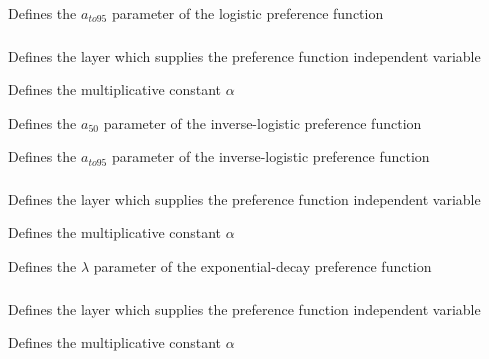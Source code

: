  {Defines the $a_{to95}$ parameter of the logistic preference function}

\subsubsection[Inverse-logistic]{}

 {Defines the layer which supplies the preference function independent variable}

 {Defines the multiplicative constant $\alpha$}

 {Defines the $a_{50}$ parameter of the inverse-logistic preference function}

 {Defines the $a_{to95}$ parameter of the inverse-logistic preference function}

\subsubsection[Exponential-decay]{}

 {Defines the layer which supplies the preference function independent variable}

 {Defines the multiplicative constant $\alpha$}

 {Defines the $\lambda$ parameter of the exponential-decay preference function}

\subsubsection[Threshold]{}

 {Defines the layer which supplies the preference function independent variable}

 {Defines the multiplicative constant $\alpha$}

